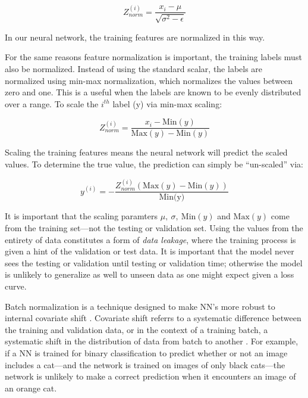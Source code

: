 \begin{equation}
    \label{z-score}
    Z_{norm}^{(i)} = \dfrac{x_i-\mu}{\sqrt{\sigma^2-\epsilon}}
\end{equation}

\noindent In our neural network, the training features are normalized in this way. 

For the same reasons feature normalization is important, the training labels must also be normalized. Instead of using the standard scalar, the labels are normalized using min-max normalization, which normalizes the values between zero and one. This is a useful when the labels are known to be evenly distributed over a range. To scale the $ i^{th} $ label (y) via min-max scaling:

\begin{equation}
    Z_{norm}^{(i)} = \dfrac{x_i - \text{Min}(y)}{\text{Max}(y) - \text{Min}(y)}
\end{equation}

Scaling the training features means the neural network will predict the scaled values. To determine the true value, the prediction can simply be ``un-scaled'' via:

\begin{equation}
    y^{(i)} = - \dfrac{Z_{norm}^{(i)}\left(\text{Max}(y) - \text{Min}(y)\right)}{\text{Min(y)}}
\end{equation}

\noindent It is important that the scaling paramters $ \mu,~\sigma,~\text{Min}(y)$ and $\text{Max}(y) $ come from the training set---not the testing or validation set. Using the values from the entirety of data constitutes a form of \textit{data leakage}, where the training process is given a hint of the validation or test data. It is important that the model never sees the testing or validation until testing or validation time; otherwise the model is unlikely to generalize as well to unseen data as one might expect given a loss curve.

Batch normalization is a technique designed to make NN's more robust to internal covariate shift \cite{batch-norm-orig}. Covariate shift referrs to a systematic difference between the training and validation data, or in the context of a training batch, a systematic shift in the distribution of data from batch to another \cite{batch-norm-conference}. For example, if a NN is trained for binary classification to predict whether or not an image includes a cat---and the network is trained on images of only black cats---the network is unlikely to make a correct prediction when it encounters an image of an orange cat.


